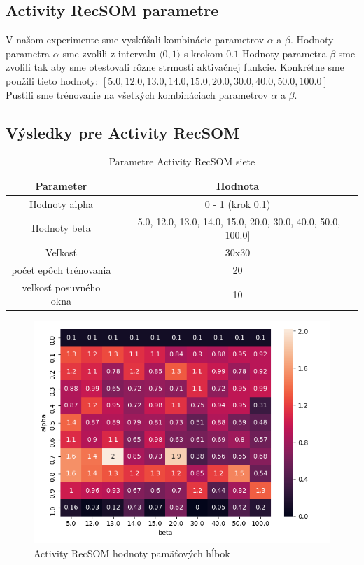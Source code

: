 \subsection{Activity RecSOM parametre}
V našom experimente sme vyskúšali kombinácie parametrov $\alpha$ a $\beta$.
Hodnoty parametra $\alpha$ sme zvolili z intervalu $\langle0, 1\rangle$ s krokom $0.1$
Hodnoty parametra $\beta$ sme zvolili tak aby sme otestovali rôzne strmosti aktivačnej funkcie.
Konkrétne sme použili tieto hodnoty: $[5.0, 12.0, 13.0, 14.0, 15.0, 20.0, 30.0, 40.0, 50.0, 100.0]$
Pustili sme trénovanie na všetkých kombináciach parametrov $\alpha$ a $\beta$.

\subsection{Výsledky pre Activity RecSOM}

\begin{table}[h!]
    \centering
    \begin{tabular}{|c|c|} 
     \hline
     Parameter & Hodnota \\ 
     \hline\hline
     Hodnoty alpha & 0 - 1 (krok 0.1) \\ 
     \hline
     Hodnoty beta & [5.0, 12.0, 13.0, 14.0, 15.0, 20.0, 30.0, 40.0, 50.0, 100.0]\\ 
     \hline
     Veľkosť & 30x30  \\
     \hline
     počet epôch trénovania & 20  \\
     \hline
     veľkosť posuvného okna & 10  \\
     \hline
    \end{tabular}
    \caption{Parametre Activity RecSOM siete}
    \label{table:1}
    \end{table}
    
    \begin{figure}[H]
        \centering
        \includegraphics[width=\textwidth]{assets/ar_memory_span}
        \caption{Activity RecSOM hodnoty pamäťových hĺbok}
        \label{memory_span_activity_recsom}
    \end{figure}
    
